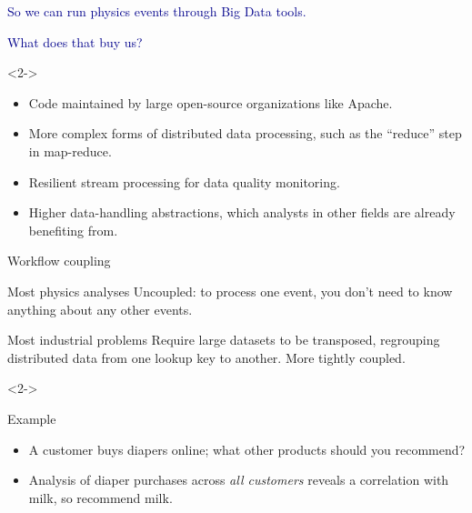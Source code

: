 \documentclass{beamer}
\begin{document}
\begin{frame}{}
\vfill
\textcolor{darkblue}{\Large So we can run physics events through Big Data \mbox{tools.\hspace{-1 cm}}}

\vspace{0.3 cm}
\textcolor{darkblue}{\Large What does that buy us?}

\begin{uncoverenv}<2->
\begin{itemize}\setlength{\itemsep}{0.2 cm}
\item Code maintained by large open-source organizations like Apache.
\item More complex forms of distributed data processing, such as the ``reduce'' step in map-reduce.
\item Resilient stream processing for data quality monitoring.
\item Higher data-handling abstractions, which analysts in other fields are already benefiting from.
\end{itemize}
\end{uncoverenv}
\end{frame}

\begin{frame}{Workflow coupling}

\begin{block}{Most physics analyses}
Uncoupled: to process one event, you don't need to know anything about any other events.
\end{block}

\begin{block}{Most industrial problems}
Require large datasets to be transposed, regrouping distributed data from one lookup key to another. More tightly coupled.
\end{block}

\begin{uncoverenv}<2->
\begin{block}{Example}
\begin{itemize}
\item A customer buys diapers online; what other products should you recommend?
\item Analysis of diaper purchases across {\it all customers} reveals a correlation with milk, so recommend milk.
\end{itemize}
\end{block}
\end{uncoverenv}
\end{frame}
\end{document}
